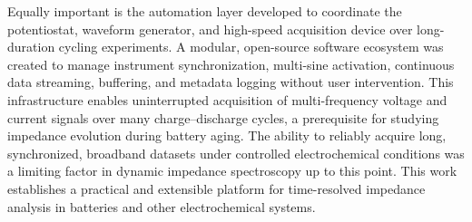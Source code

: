 Equally important is the automation layer developed to coordinate the potentiostat, waveform generator, and high-speed acquisition device over long-duration cycling experiments.
A modular, open-source software ecosystem was created to manage instrument synchronization, multi-sine activation, continuous data streaming, buffering, and metadata logging without user intervention.
This infrastructure enables uninterrupted acquisition of multi-frequency voltage and current signals over many charge--discharge cycles, a prerequisite for studying impedance evolution during battery aging.
The ability to reliably acquire long, synchronized, broadband datasets under controlled electrochemical conditions was a limiting factor in dynamic impedance spectroscopy up to this point.
This work establishes a practical and extensible platform for time-resolved impedance analysis in batteries and other electrochemical systems.